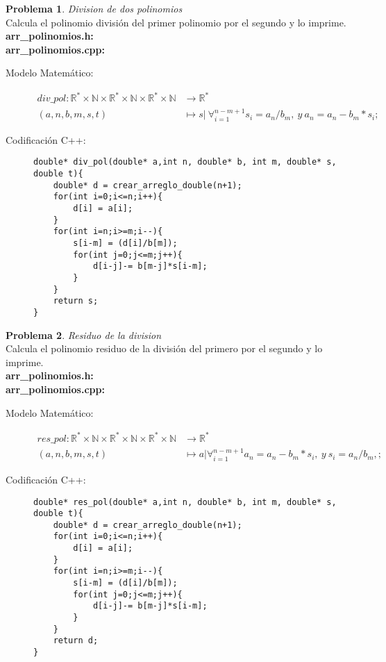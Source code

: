 \documentclass{article}
\theoremstyle{plain}
\theoremstyle{definition}
\newtheorem{problem}{Problema}
\begin{document}
\begin{problem} \emph{Division de dos polinomios}\\
Calcula el polinomio división del primer polinomio por el segundo y lo imprime.\\
\textbf{arr\_polinomios.h:}\ \\
\textbf{arr\_polinomios.cpp:}\ 
%
\begin{description}
\item[Modelo Matemático:]
%
\begin{align*}
div\_pol: \mathbb{R}^*\times\mathbb{N}\times\mathbb{R}^*\times\mathbb{N}\times\mathbb{R}^*\times\mathbb{N} &\to \mathbb{R}^*\\
(a,n,b,m,s,t) &\mapsto s|\ \forall_{i=1}^{n-m+1} s_i = a_n/b_m,\ y\ a_n = a_n - b_m*s_i; 
\end{align*}
%
\item[Codificación \textsf{C++}:]\hfill
%
\begin{verbatim}
double* div_pol(double* a,int n, double* b, int m, double* s, double t){
    double* d = crear_arreglo_double(n+1);
    for(int i=0;i<=n;i++){
        d[i] = a[i];
    }
    for(int i=n;i>=m;i--){
        s[i-m] = (d[i]/b[m]);
        for(int j=0;j<=m;j++){
            d[i-j]-= b[m-j]*s[i-m];
        }
    }
    return s;
}
\end{verbatim}
\end{description}
\end{problem}

\begin{problem} \emph{Residuo de la division}\\
Calcula el polinomio residuo de la división del primero por el segundo y lo imprime.\\
\textbf{arr\_polinomios.h:}\ \\
\textbf{arr\_polinomios.cpp:}\ 
%
\begin{description}
\item[Modelo Matemático:]
%
\begin{align*}
res\_pol: \mathbb{R}^*\times\mathbb{N}\times\mathbb{R}^*\times\mathbb{N}\times\mathbb{R}^*\times\mathbb{N} &\to \mathbb{R}^*\\
(a,n,b,m,s,t) &\mapsto a| \forall_{i=1}^{n-m+1} a_n = a_n - b_m*s_i ,\ y\ s_i = a_n/b_m,;
\end{align*}
%
\item[Codificación \textsf{C++}:]\hfill
%
\begin{verbatim}
double* res_pol(double* a,int n, double* b, int m, double* s, double t){
    double* d = crear_arreglo_double(n+1);
    for(int i=0;i<=n;i++){
        d[i] = a[i];
    }
    for(int i=n;i>=m;i--){
        s[i-m] = (d[i]/b[m]);
        for(int j=0;j<=m;j++){
            d[i-j]-= b[m-j]*s[i-m];
        }
    }
    return d;
}
\end{verbatim}
\end{description}
\end{problem}
\end{document}
